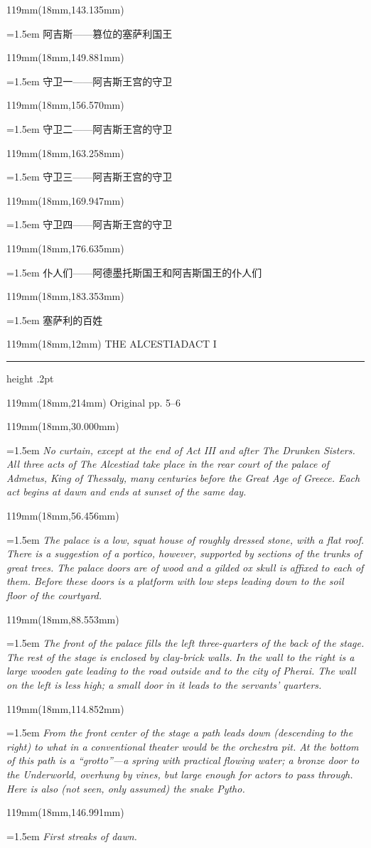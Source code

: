 \documentclass{article}
\newcommand{\ENsetup}{\normalfont\color{ink}\fontsize{11}{16.5}\selectfont\emergencystretch=1.5em}
\newcommand{\ZHsetup}{\normalfont\color{ink}\fontsize{10.5}{17}\selectfont\emergencystretch=1.5em}
\newcommand{\Block}[3]{\begin{textblock*}{119mm}(18mm,#1mm){#2 #3\par}\end{textblock*}}
\newcommand{\Heading}[3]{%
  \begin{textblock*}{119mm}(18mm,12mm)
    \color{quiet}\fontsize{7.5}{10}\selectfont
    #1\hfill #2\par\vspace{3mm}\hrule height .2pt
  \end{textblock*}
  \begin{textblock*}{119mm}(18mm,214mm)
    \color{quiet}\fontsize{7}{10}\selectfont #3\hfill\thepage
  \end{textblock*}
}
\begin{document}
\Block{143.135}{\ZHsetup}{阿吉斯——篡位的塞萨利国王\par }
\Block{149.881}{\ZHsetup}{守卫一——阿吉斯王宫的守卫\par }
\Block{156.570}{\ZHsetup}{守卫二——阿吉斯王宫的守卫\par }
\Block{163.258}{\ZHsetup}{守卫三——阿吉斯王宫的守卫\par }
\Block{169.947}{\ZHsetup}{守卫四——阿吉斯王宫的守卫\par }
\Block{176.635}{\ZHsetup}{仆人们——阿德墨托斯国王和阿吉斯国王的仆人们\par }
\Block{183.353}{\ZHsetup}{塞萨利的百姓\par }
\newpage
\null
\Heading{THE ALCESTIAD}{ACT I}{Original pp. 5–6}
\Block{30.000}{\ENsetup}{\itshape 
No curtain, except at the end of Act III and after \textit{The Drunken Sisters}. All three acts of \textit{The Alcestiad} take place in the rear court of the palace of Admetus, King of Thessaly, many centuries before the Great Age of Greece. Each act begins at dawn and ends at sunset of the same day.\par}
\Block{56.456}{\ENsetup}{\itshape 
The palace is a low, squat house of roughly dressed stone, with a flat roof. There is a suggestion of a portico, however, supported by sections of the trunks of great trees. The palace doors are of wood and a gilded ox skull is affixed to each of them. Before these doors is a platform with low steps leading down to the soil floor of the courtyard.\par}
\Block{88.553}{\ENsetup}{\itshape 
The front of the palace fills the left three-quarters of the back of the stage. The rest of the stage is enclosed by clay-brick walls. In the wall to the right is a large wooden gate leading to the road outside and to the city of Pherai. The wall on the left is less high; a small door in it leads to the servants' quarters.\par}
\Block{114.852}{\ENsetup}{\itshape 
From the front center of the stage a path leads down (descending to the right) to what in a conventional theater would be the orchestra pit. At the bottom of this path is a ``grotto''—a spring with practical flowing water; a bronze door to the Underworld, overhung by vines, but large enough for actors to pass through. Here is also (not seen, only assumed) the snake Pytho.\par}
\Block{146.991}{\ENsetup}{\itshape 
First streaks of dawn.\par}
\end{document}
